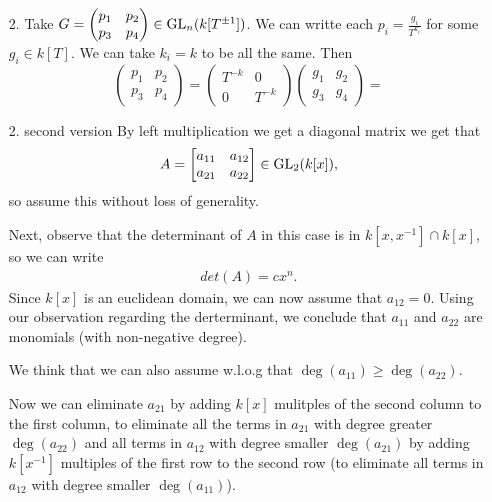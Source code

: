 \begin{exercise}{2}
\begin{enumerate}
    \item[2.]{
            Take $G = \begin{pmatrix} p_1 & p_2 \\ p_3 & p_4 \end{pmatrix} \in
                \operatorname{GL}_n(k[T^{\pm 1}])$. We can writte each $p_i =
                \frac{g_i}{T^{k_i}}$ for some $g_i \in k[T]$. We can take $k_i =
                k$ to be all the same. Then
                \begin{equation}
                    \begin{pmatrix} p_1 & p_2 \\ p_3 & p_4 \end{pmatrix} =
                        \begin{pmatrix} T^{-k} & 0 \\ 0 & T^{-k} \end{pmatrix} 
                    \begin{pmatrix} g_1 & g_2 \\ g_3 & g_4 \end{pmatrix} = 
                \end{equation}
        }
    \item[2. second version]
    By left multiplication we get a diagonal matrix we get that 
    \begin{align*}
        A=\begin{bmatrix}
            a_{11}&a_{12}\\
            a_{21}&a_{22}
        \end{bmatrix}
        \in \operatorname{GL}_2(k[x]),
    \end{align*}
    so assume this without loss of generality.

    Next, observe that the determinant of $A$ in this case is in $k[x,x^{-1}]\cap k[x]$, so we can write 
    \begin{align*}
        det(A)=cx^n.
    \end{align*}
    Since $k[x]$ is an euclidean domain, we can now assume that $a_{12}=0$. Using our observation regarding
    the derterminant, we conclude that $a_{11}$ and $a_{22}$ are monomials (with non-negative degree).

    We think that we can also assume w.l.o.g that $\deg(a_{11})\geq \deg(a_{22})$.


    Now we can eliminate $a_{21}$ by adding $k[x]$ mulitples of the second column to the first column, to 
    eliminate all the terms in $a_{21}$ with degree greater $\deg(a_{22})$ and all terms in
    $a_{12}$ with degree smaller $\deg(a_{21})$ by adding $k[x^{-1}]$ multiples of the first row 
    to the second row (to eliminate all terms in $a_{12}$ with degree smaller $\deg(a_{11})$).


\end{enumerate}
\end{exercise}
